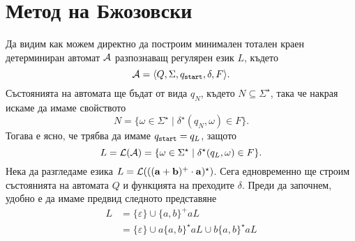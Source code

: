 \section{Метод на Бжозовски}


Да видим как можем директно да построим минимален тотален краен детерминиран автомат $\mathcal{A}$
разпознаващ регулярен език $L$, където \[\mathcal{A} = \langle{Q,\Sigma,q_{\texttt{start}},\delta,F}\rangle.\]
Състоянията на автомата ще бъдат от вида $q_N$, където $N \subseteq \Sigma^\star$, така че накрая искаме да имаме свойството
\[N = \{\omega \in \Sigma^\star \mid \delta^\star(q_N,\omega) \in F\}.\]
Тогава е ясно, че трябва да имаме $q_{\texttt{start}} = q_L$, защото 
\[L = \mathcal{L}(\mathcal{A}) = \{\omega \in \Sigma^\star \mid \delta^\star(q_L,\omega) \in F\}.\]
Нека да разгледаме езика $L = \mathcal{L}(\mathbf{((a+b)^+\cdot a)^\star})$.
Сега едновременно ще строим състоянията на автомата $Q$ и функцията на преходите $\delta$.
Преди да започнем, удобно е да имаме предвид следното представяне
\begin{align*}
  L & = \{\varepsilon\} \cup \{a,b\}^+ a L\\
  & = \{\varepsilon\} \cup a\{a,b\}^\star aL \cup b\{a,b\}^\star aL
\end{align*}

